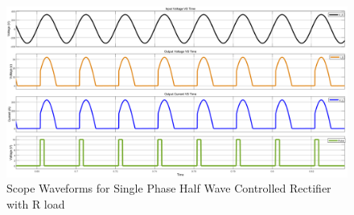 \begin{figure}[h]
    \centering
    \includegraphics[width=1\textwidth]{images/experiment-1/circuit-scope-experiment-05.png}
    \caption{Scope Waveforms for Single Phase Half Wave Controlled Rectifier with R load}
    \label{Fig_waveform_single-phase-half-wave-controlled-rectifier-with-R-load}
\end{figure}

\pagebreak
